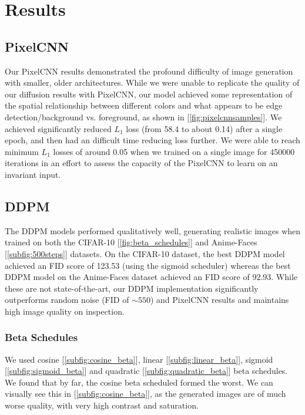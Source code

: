 \documentclass[10pt,twocolumn,letterpaper]{article}
\begin{document}
\section{Results}
\subsection{PixelCNN}
Our PixelCNN results demonstrated the profound difficulty of image generation with smaller, older architectures. While we were unable to replicate the quality of our diffusion results with PixelCNN, our model achieved some representation of the spatial relationship between different colors and what appears to be edge detection/background vs. foreground, as shown in [\ref{fig:pixelcnnsamples}]. We achieved significantly reduced $L_1$ loss (from 58.4 to about 0.14) after a single epoch, and then had an difficult time reducing loss further. We were able to reach minimum $L_1$ losses of around 0.05 when we trained on a single image for 450000 iterations in an effort to assess the capacity of the PixelCNN to learn on an invariant input. 

\subsection{DDPM}
The DDPM models performed qualitatively well, generating realistic images when trained on both the CIFAR-10 [\ref{fig:beta_schedules}] and Anime-Faces [\ref{subfig:500steps}] datasets. On the CIFAR-10 dataset, the best DDPM model achieved an FID score of 123.53 (using the sigmoid scheduler) whereas the best DDPM model on the Anime-Faces dataset achieved an FID score of 92.93. While these are not state-of-the-art, our DDPM implementation significantly outperforms random noise (FID of $\sim550$) and PixelCNN results and maintains high image quality on inspection.

\subsubsection{Beta Schedules}
\label{subsubsec:beta}
We used cosine [\ref{subfig:cosine_beta}], linear [\ref{subfig:linear_beta}], sigmoid [\ref{subfig:sigmoid_beta}] and quadratic [\ref{subfig:quadratic_beta}] beta schedules. We found that by far, the cosine beta scheduled formed the worst. We can visually see this in [\ref{subfig:cosine_beta}], as the generated images are of much worse quality, with very high contrast and saturation. 
\end{document}
